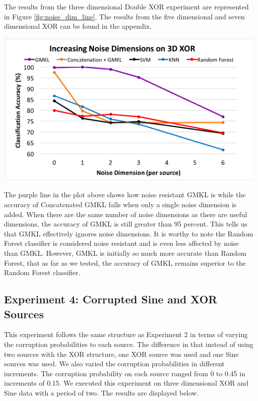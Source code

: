 \documentclass{article}
\begin{document}
The results from the three dimensional Double XOR experiment are represented in
Figure \ref{fig:noise_dim_line}. The results from the five dimensional and
seven dimensional XOR can be found in the appendix.

\begin{minipage}{\textwidth}
    \centering
    \includegraphics[scale=0.7]{Noise_Dim_line.png}
    \label{fig:noise_dim_line}
\end{minipage}

The purple line in the plot above shows how noise resistant GMKL is while the
accuracy of Concatenated GMKL falls when only a single noise dimension is
added. When there are the same number of noise dimensions as there are useful
dimensions, the accuracy of GMKL is still greater than 95 percent. This tells
us that GMKL effectively ignores noise dimensions. It is worthy to note the
Random Forest classifier is considered noise resistant and is even less
affected by noise than GMKL. However, GMKL is initially so much more accurate
than Random Forest, that as far as we tested, the accuracy of GMKL remains
superior to the Random Forest classifier.



\subsection*{Experiment 4: Corrupted Sine and XOR Sources}

This experiment follows the same structure as Experiment 2 in terms of varying
the corruption probabilities to each source. The difference in that instead of
using two sources with the XOR structure, one XOR source was used and one Sine
sources was used. We also varied the corruption probabilities in different
increments. The corruption probability on each source ranged from 0 to 0.45 in
increments of 0.15. We executed this experiment on three dimensional XOR and
Sine data with a period of two. The results are displayed below.
\end{document}
